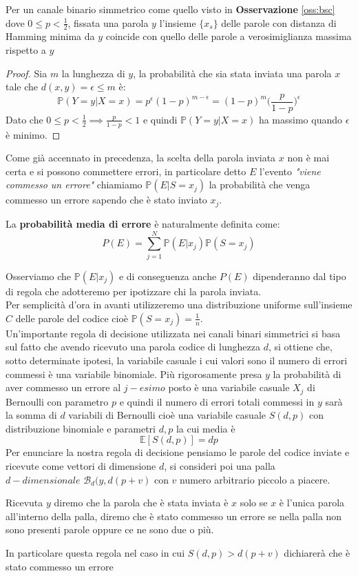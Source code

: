 \begin{teo}
Per un canale binario simmetrico come quello visto in \textbf{Osservazione} \ref{oss:bsc} dove $0 \leq p < \frac{1}{2}$, fissata una parola $y$ l'insieme $\{ x_s \}$ delle parole con distanza di Hamming minima da $y$ coincide con quello delle parole a verosimiglianza massima rispetto a $y$
\end{teo}
\begin{proof}
Sia $m$ la lunghezza di $y$, la probabilità che sia stata inviata una parola $x$ tale che $d(x,y)=\epsilon \leq m$ è:
$$\mathbb{P}(Y=y|X=x)= p^{\epsilon}(1-p)^{m-\epsilon}=(1-p)^m \bigg( \frac{p}{1-p} \bigg)^{\epsilon}$$
Dato che $0 \leq p < \frac{1}{2} \implies \frac{p}{1-p}<1 $ e quindi $\mathbb{P}(Y=y|X=x)$ ha massimo quando $\epsilon$ è minimo.
\end{proof}
Come già accennato in precedenza, la scelta della parola inviata $x$ non è mai certa e si possono commettere errori, in particolare detto $E$ l'evento \textit{"viene commesso un errore"} chiamiamo $\mathbb{P}(E|S=x_j)$ la probabilità che venga commesso un errore sapendo che è stato inviato $x_j$.
\begin{defi}
La \textbf{probabilità media di errore} è naturalmente definita come:
$$P(E)=\sum_{j=1}^{N}\mathbb{P}(E|x_j)\mathbb{P}(S=x_j)$$
\end{defi}
Osserviamo che $\mathbb{P}(E|x_j)$ e di conseguenza anche $P(E)$ dipenderanno dal tipo di regola che adotteremo per ipotizzare chi la parola inviata.\\
Per semplicità d'ora in avanti utilizzeremo una distribuzione uniforme sull'insieme $C$ delle parole del codice cioè $\mathbb{P}(S=x_j)=\frac{1}{n}$.\\
Un'importante regola di decisione utilizzata nei canali binari simmetrici si basa sul fatto che avendo ricevuto una parola codice di lunghezza $d$, si ottiene che, sotto determinate ipotesi, la variabile casuale i cui valori sono il numero di errori commessi è una variabile binomiale. Più rigorosamente presa $y$ la probabilità di aver commesso un errore al $j-esimo$ posto è una variabile casuale $X_j$ di Bernoulli con parametro $p$ e quindi il numero di errori totali commessi in $y$ sarà la somma di $d$ variabili di Bernoulli cioè una variabile casuale $S(d,p)$ con distribuzione binomiale e parametri $d,p$ la cui media è
$$\mathbb{E}[S(d,p)]=dp$$
Per enunciare la nostra regola di decisione pensiamo le parole del codice inviate e ricevute come vettori di dimensione $d$, si consideri poi una palla $d-dimensionale$ $\mathcal{B}_d(y,d(p+v)$ con $v$ numero arbitrario piccolo a piacere. 
\begin{defi} \label{defi:decisione}
Ricevuta $y$ diremo che la parola che è stata inviata è $x$ solo se $x$ è l'unica parola all'interno della palla, diremo che è stato commesso un errore se nella palla non sono presenti parole oppure ce ne sono due o più.
\end{defi}
In particolare questa regola nel caso in cui $S(d,p)>d(p+v)$ dichiarerà che è stato commesso un errore


